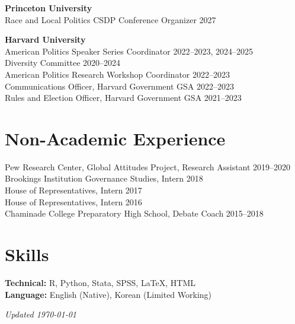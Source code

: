 \documentclass[11pt, letterpaper]{article}
\newcommand{\entry}[2]{\noindent #1 \hfill #2\\}
\begin{document}
\vspace{1ex}
\noindent\textbf{Princeton University}\\
Race and Local Politics CSDP Conference Organizer \hfill 2027

\vspace{1ex}
\noindent\textbf{Harvard University}\\
American Politics Speaker Series Coordinator \hfill 2022--2023, 2024--2025\\
Diversity Committee \hfill 2020--2024\\
American Politics Research Workshop Coordinator \hfill 2022--2023\\
Communications Officer, Harvard Government GSA \hfill 2022--2023\\
Rules and Election Officer, Harvard Government GSA \hfill 2021--2023

\section{Non-Academic Experience}

\entry{Pew Research Center, Global Attitudes Project, Research Assistant}{2019--2020}
\entry{Brookings Institution Governance Studies, Intern}{2018}
\entry{House of Representatives, Intern}{2017}
\entry{House of Representatives, Intern}{2016}
\entry{Chaminade College Preparatory High School, Debate Coach}{2015--2018}

\section{Skills}

\noindent\textbf{Technical:} R, Python, Stata, SPSS, LaTeX, HTML\\
\textbf{Language:} English (Native), Korean (Limited Working)

\vfill
\hfill \small{\textit{Updated \today}}
\end{document}
